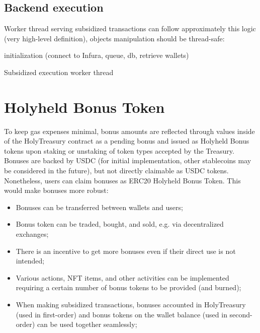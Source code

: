 \documentclass[12pt]{article}
\begin{document}
\subsection{Backend execution}

Worker thread serving subsidized transactions can follow approximately this logic (very high-level definition), objects manipulation should be thread-safe:

\begin{algorithm}[H]
\SetAlgoLined
{}
 initialization (connect to Infura, queue, db, retrieve wallets)\;
 \caption{Subsidized execution worker thread}
\end{algorithm}

\section{Holyheld Bonus Token}
\label{sec:bonus_token_section}

To keep gas expenses minimal, bonus amounts are reflected through values inside of the HolyTreasury contract as a pending bonus and issued as Holyheld Bonus tokens upon staking or unstaking of token types accepted by the Treasury. Bonuses are backed by USDC (for initial implementation, other stablecoins may be considered in the future), but not directly claimable as USDC tokens. Nonetheless, users can claim bonuses as ERC20 Holyheld Bonus Token. This would make bonuses more robust:
\begin{itemize}
\item Bonuses can be transferred between wallets and users;
\item Bonus token can be traded, bought, and sold, e.g. via decentralized exchanges;
\item There is an incentive to get more bonuses even if their direct use is not intended;
\item Various actions, NFT items, and other activities can be implemented requiring a certain number of bonus tokens to be provided (and burned);
\item When making subsidized transactions, bonuses accounted in HolyTreasury (used in first-order) and bonus tokens on the wallet balance (used in second-order) can be used together seamlessly;
\end{itemize}
\end{document}

